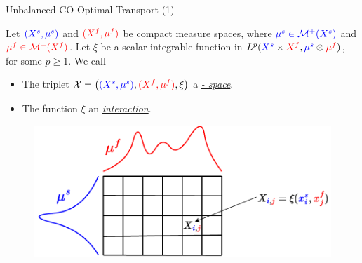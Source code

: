\documentclass{beamer}
\newcommand{\cX}{\mathcal X}
\newcommand{\cM}{\mathcal M}
\begin{document}
\begin{frame}{Unbalanced CO-Optimal Transport (1)}
\tiny
  \begin{definition}
      Let ${\color{blue}{(X^s, \mu^s)}}$ and ${\color{red}{(X^f, \mu^f)}}$ be compact measure spaces, where ${\color{blue}{\mu^s \in \cM^+(X^s)}}$ and ${\color{red}{\mu^f \in \cM^+(X^f)}}$. Let $\xi$ be a scalar integrable function in $L^p({\color{blue}{X^s}} \times {\color{red}{X^f}}, {\color{blue}{\mu^s}} \otimes {\color{red}{\mu^f}})$, for some $p \geq 1$. We call
      \begin{itemize}
        \item The triplet  $\cX = \left({\color{blue}{(X^s, \mu^s)}}, {\color{red}{(X^f, \mu^f)}}, \xi \right)$ a \underline{\textit{{\color{blue}{sample}} - {\color{red}{feature}} space}}.

        \item The function $\xi$ an \textit{\underline{interaction}}.
      \end{itemize}
      \end{definition}
  \vspace{-0.2cm}
  \begin{figure}
      \centering
      \includegraphics[width=.8\linewidth, keepaspectratio=true]{OT_new/coot_matrix_single.pdf}
  \end{figure}
  \end{frame}
\end{document}
